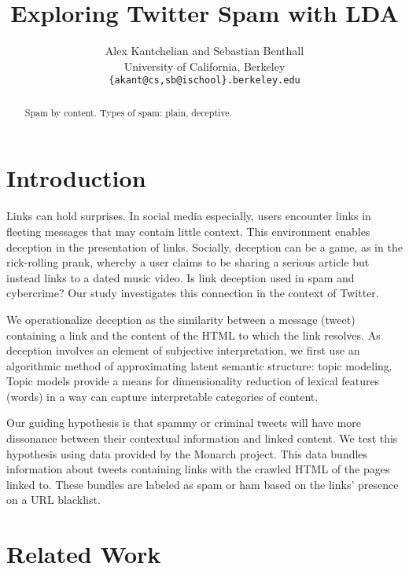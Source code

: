 \documentclass[times, 11pt, twocolumn]{article}
\begin{document}
\title{Exploring Twitter Spam with LDA}
\author{Alex Kantchelian and Sebastian Benthall \\
University of California, Berkeley \\
 \texttt{\{akant@cs,sb@ischool\}.berkeley.edu}\\
 }
 \date{}

\maketitle

\begin{abstract}
	Spam by content. Types of spam: plain, deceptive.
\end{abstract}

\section{Introduction}

Links can hold surprises.
In social media especially, users encounter links in fleeting messages that may contain little context.
This environment enables deception in the presentation of links.
Socially, deception can be a game, as in the rick-rolling prank, whereby a user claims to be sharing a serious article but instead links to a dated music video.
Is link deception used in spam and cybercrime?
Our study investigates this connection in the context of Twitter.

We operationalize deception as the similarity between a message (tweet) containing a link and the content of the HTML to which the link resolves.
As deception involves an element of subjective interpretation, we first use an algorithmic method of approximating latent semantic structure: topic modeling.
Topic models provide a means for dimensionality reduction of lexical features (words) in a way can capture interpretable categories of content.\cite{Blei2003}

Our guiding hypothesis is that spammy or criminal tweets will have more dissonance between their contextual information and linked content.
We test this hypothesis using data provided by the Monarch project.\cite{Thomas2011}
This data bundles information about tweets containing links with the crawled HTML of the pages linked to.
These bundles are labeled as spam or ham based on the links' presence on a URL blacklist.


\section{Related Work}
\end{document}
